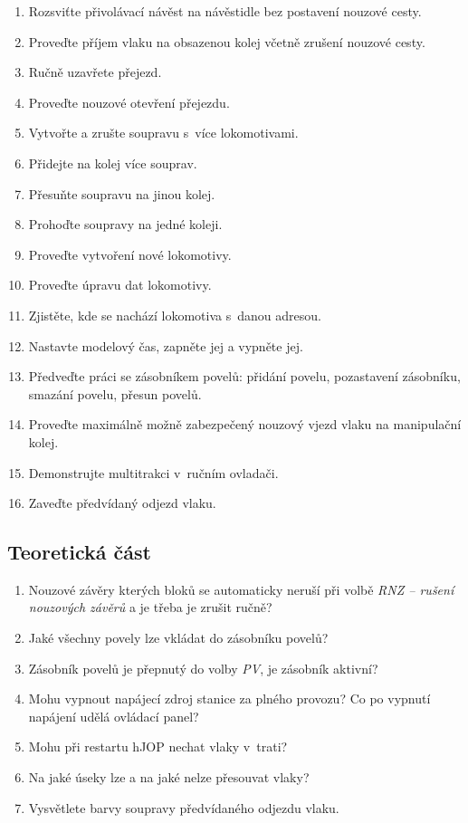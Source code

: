 \documentclass[12pt,a4paper]{article}
\begin{document}
\begin{enumerate}[leftmargin=*]
\item Rozsviťte přivolávací návěst na návěstidle bez postavení nouzové cesty.
\item Proveďte příjem vlaku na obsazenou kolej včetně zrušení nouzové cesty.
\item Ručně uzavřete přejezd.
\item Proveďte nouzové otevření přejezdu.
\item Vytvořte a zrušte soupravu s~více lokomotivami.
\item Přidejte na kolej více souprav.
\item Přesuňte soupravu na jinou kolej.
\item Prohoďte soupravy na jedné koleji.
\item Proveďte vytvoření nové lokomotivy.
\item Proveďte úpravu dat lokomotivy.
\item Zjistěte, kde se nachází lokomotiva s~danou adresou.
\item Nastavte modelový čas, zapněte jej a vypněte jej.
\item Předveďte práci se zásobníkem povelů: přidání povelu, pozastavení
zásobníku, smazání povelu, přesun povelů.
\item Proveďte maximálně možně zabezpečený nouzový vjezd vlaku na manipulační
kolej.
\item Demonstrujte multitrakci v~ručním ovladači.
\item Zaveďte předvídaný odjezd vlaku.
\end{enumerate}


\subsection{Teoretická část}

\begin{enumerate}[leftmargin=*]
\item Nouzové závěry kterých bloků se automaticky neruší při volbě \textit{RNZ
– rušení nouzových závěrů} a je třeba je zrušit ručně?
\item Jaké všechny povely lze vkládat do zásobníku povelů?
\item Zásobník povelů je přepnutý do volby \textit{PV}, je zásobník aktivní?
\item Mohu vypnout napájecí zdroj stanice za plného provozu? Co po vypnutí
napájení udělá ovládací panel?
\item Mohu při restartu hJOP nechat vlaky v~trati?
\item Na jaké úseky lze a na jaké nelze přesouvat vlaky?
\item Vysvětlete barvy soupravy předvídaného odjezdu vlaku.
\end{enumerate}
\end{document}
